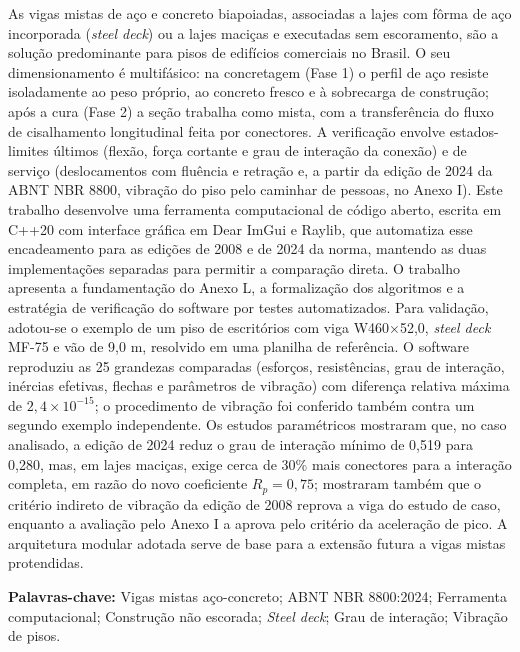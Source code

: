\setlength{\absparsep}{18pt}
\begin{resumo}
As vigas mistas de aço e concreto biapoiadas, associadas a lajes com fôrma de aço incorporada (\emph{steel deck}) ou a lajes maciças e executadas sem escoramento, são a solução predominante para pisos de edifícios comerciais no Brasil. O seu dimensionamento é multifásico: na concretagem (Fase 1) o perfil de aço resiste isoladamente ao peso próprio, ao concreto fresco e à sobrecarga de construção; após a cura (Fase 2) a seção trabalha como mista, com a transferência do fluxo de cisalhamento longitudinal feita por conectores. A verificação envolve estados-limites últimos (flexão, força cortante e grau de interação da conexão) e de serviço (deslocamentos com fluência e retração e, a partir da edição de 2024 da ABNT NBR 8800, vibração do piso pelo caminhar de pessoas, no Anexo I). Este trabalho desenvolve uma ferramenta computacional de código aberto, escrita em C++20 com interface gráfica em Dear ImGui e Raylib, que automatiza esse encadeamento para as edições de 2008 e de 2024 da norma, mantendo as duas implementações separadas para permitir a comparação direta. O trabalho apresenta a fundamentação do Anexo L, a formalização dos algoritmos e a estratégia de verificação do software por testes automatizados. Para validação, adotou-se o exemplo de um piso de escritórios com viga W460\ensuremath{\times}52,0, \emph{steel deck} MF-75 e vão de 9,0 m, resolvido em uma planilha de referência. O software reproduziu as 25 grandezas comparadas (esforços, resistências, grau de interação, inércias efetivas, flechas e parâmetros de vibração) com diferença relativa máxima de $2{,}4 \times 10^{-15}$; o procedimento de vibração foi conferido também contra um segundo exemplo independente. Os estudos paramétricos mostraram que, no caso analisado, a edição de 2024 reduz o grau de interação mínimo de 0,519 para 0,280, mas, em lajes maciças, exige cerca de 30\% mais conectores para a interação completa, em razão do novo coeficiente $R_p = 0{,}75$; mostraram também que o critério indireto de vibração da edição de 2008 reprova a viga do estudo de caso, enquanto a avaliação pelo Anexo I a aprova pelo critério da aceleração de pico. A arquitetura modular adotada serve de base para a extensão futura a vigas mistas protendidas.

\textbf{Palavras-chave:} Vigas mistas aço-concreto; ABNT NBR 8800:2024; Ferramenta computacional; Construção não escorada; \emph{Steel deck}; Grau de interação; Vibração de pisos.
\end{resumo}
